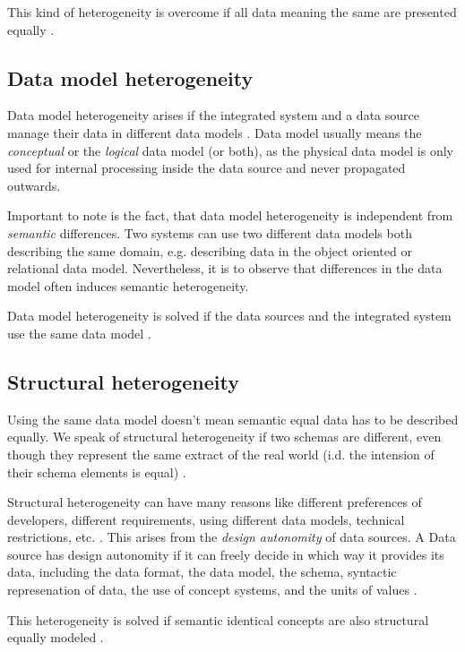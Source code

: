 This kind of heterogeneity is overcome if all data meaning the same are presented equally \cite[p. 61]{DBLP:books/dp/LeserN2006}.

\subsection{Data model  heterogeneity}
Data model heterogeneity arises if the integrated system and a data source manage their data in different data models \cite[p. 65]{DBLP:books/dp/LeserN2006}. Data model usually means the \emph{conceptual} or the \emph{logical} data model (or both), as the physical data model is only used for internal processing inside the data source and never propagated outwards.

Important to note is the fact, that data model heterogeneity is independent from \emph{semantic} differences. Two systems can use two different data models both describing the same domain, e.g. describing data in the object oriented or relational data model. Nevertheless, it is to observe that differences in the data model often induces semantic heterogeneity.

Data model heterogeneity is solved if the data sources and the integrated system use the same data model \cite[p. 61]{DBLP:books/dp/LeserN2006}.

\subsection{Structural  heterogeneity}
Using the same data model doesn't mean semantic equal data has to be described equally. We speak of structural heterogeneity if two schemas are different, even though they represent the same extract of the real world (i.d. the intension of their schema elements is equal) \cite[p. 67]{DBLP:books/dp/LeserN2006}. 

Structural heterogeneity can have many reasons like different preferences of developers, different requirements, using different data models, technical restrictions, etc. . This arises from the \textit{design autonomity} of data sources. A Data source has design autonomity if it can freely decide in which way it provides its data, including the data format, the data model, the schema, syntactic represenation of data, the use of concept systems, and the units of values \cite[p.55]{DBLP:books/dp/LeserN2006}.

This heterogeneity is solved if semantic identical concepts are also structural equally modeled  \cite[p. 61]{DBLP:books/dp/LeserN2006}.

